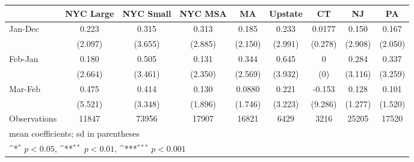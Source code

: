 {
\def\sym#1{\ifmmode^{#1}\else\(^{#1}\)\fi}
\begin{tabular}{l*{8}{c}}
\hline\hline
                    &\multicolumn{1}{c}{NYC Large}&\multicolumn{1}{c}{NYC Small}&\multicolumn{1}{c}{NYC MSA}&\multicolumn{1}{c}{MA}&\multicolumn{1}{c}{Upstate}&\multicolumn{1}{c}{CT}&\multicolumn{1}{c}{NJ}&\multicolumn{1}{c}{PA}\\
\hline
Jan-Dec             &       0.223         &       0.315         &       0.313         &       0.185         &       0.233         &      0.0177         &       0.150         &       0.167         \\
                    &     (2.097)         &     (3.655)         &     (2.885)         &     (2.150)         &     (2.991)         &     (0.278)         &     (2.908)         &     (2.050)         \\
[1em]
Feb-Jan             &       0.180         &       0.505         &       0.131         &       0.344         &       0.645         &           0         &       0.284         &       0.337         \\
                    &     (2.664)         &     (3.461)         &     (2.350)         &     (2.569)         &     (3.932)         &         (0)         &     (3.116)         &     (3.259)         \\
[1em]
Mar-Feb             &       0.475         &       0.414         &       0.130         &      0.0880         &       0.221         &      -0.153         &       0.128         &       0.101         \\
                    &     (5.521)         &     (3.348)         &     (1.896)         &     (1.746)         &     (3.223)         &     (9.286)         &     (1.277)         &     (1.520)         \\
\hline
Observations        &       11847         &       73956         &       17907         &       16821         &        6429         &        3216         &       25205         &       17520         \\
\hline\hline
\multicolumn{9}{l}{\footnotesize mean coefficients; sd in parentheses}\\
\multicolumn{9}{l}{\footnotesize \sym{*} \(p<0.05\), \sym{**} \(p<0.01\), \sym{***} \(p<0.001\)}\\
\end{tabular}
}
